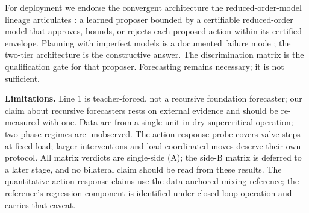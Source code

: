 \documentclass{article}
\begin{document}
For deployment we endorse the convergent architecture the reduced-order-model lineage
articulates \cite{ghosh2026rom, benner2015survey, sha2001simplicity}: a learned
proposer bounded by a certifiable reduced-order model that approves, bounds, or rejects
each proposed action within its certified envelope. Planning with imperfect models is a
documented failure mode \cite{jafferjee2021hallucinating, wang2022doublecheck}; the
two-tier architecture is the constructive answer. The discrimination matrix is the
qualification gate for that proposer. Forecasting remains necessary; it is not
sufficient.

\textbf{Limitations.} Line 1 is teacher-forced, not a recursive foundation forecaster;
our claim about recursive forecasters rests on external evidence
\cite{wan2026forecast} and should be re-measured with one. Data are from a single unit
in dry supercritical operation; two-phase regimes are unobserved. The action-response
probe covers valve steps at fixed load; larger interventions and load-coordinated
moves deserve their own protocol. All matrix verdicts are single-side (A); the
side-B matrix is deferred to a later stage, and no bilateral claim should be read
from these results. The quantitative action-response claims use the data-anchored
mixing reference; the reference's regression component is identified under
closed-loop operation and carries that caveat.



\end{document}
